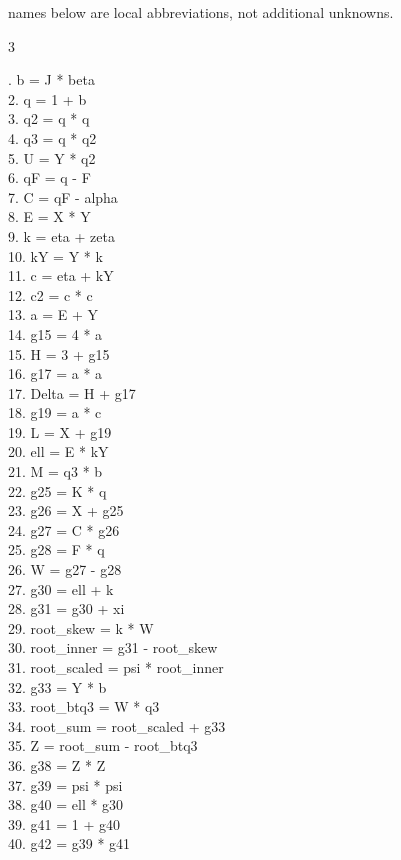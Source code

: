 \documentclass[10pt]{article}
\begin{document}
names below are local abbreviations, not additional unknowns.
\begin{multicols}{3}
\raggedright\ttfamily\fontsize{7.2}{8.4}. b = J * beta\\
2. q = 1 + b\\
3. q2 = q * q\\
4. q3 = q * q2\\
5. U = Y * q2\\
6. qF = q - F\\
7. C = qF - alpha\\
8. E = X * Y\\
9. k = eta + zeta\\
10. kY = Y * k\\
11. c = eta + kY\\
12. c2 = c * c\\
13. a = E + Y\\
14. g15 = 4 * a\\
15. H = 3 + g15\\
16. g17 = a * a\\
17. Delta = H + g17\\
18. g19 = a * c\\
19. L = X + g19\\
20. ell = E * kY\\
21. M = q3 * b\\
22. g25 = K * q\\
23. g26 = X + g25\\
24. g27 = C * g26\\
25. g28 = F * q\\
26. W = g27 - g28\\
27. g30 = ell + k\\
28. g31 = g30 + xi\\
29. root\_skew = k * W\\
30. root\_inner = g31 - root\_skew\\
31. root\_scaled = psi * root\_inner\\
32. g33 = Y * b\\
33. root\_btq3 = W * q3\\
34. root\_sum = root\_scaled + g33\\
35. Z = root\_sum - root\_btq3\\
36. g38 = Z * Z\\
37. g39 = psi * psi\\
38. g40 = ell * g30\\
39. g41 = 1 + g40\\
40. g42 = g39 * g41\\

\end{multicols}
\end{document}
